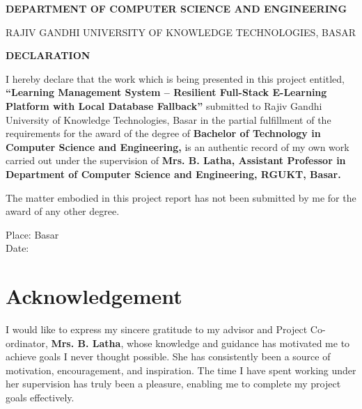 \documentclass[12pt,a4paper]{report}
\begin{document}
\begin{center}
{\fontsize{14}{16.8}\bfseries DEPARTMENT OF COMPUTER SCIENCE AND ENGINEERING\par
RAJIV GANDHI UNIVERSITY OF KNOWLEDGE TECHNOLOGIES, BASAR\par}
\vspace{1.25cm}

{\fontsize{16}{24}\bfseries DECLARATION\par}
\end{center}

\vspace{1cm}

I hereby declare that the work which is being presented in this project entitled, \textbf{``Learning Management System -- Resilient Full-Stack E-Learning Platform with Local Database Fallback''} submitted to Rajiv Gandhi University of Knowledge Technologies, Basar in the partial fulfillment of the requirements for the award of the degree of \textbf{Bachelor of Technology in Computer Science and Engineering,} is an authentic record of my own work carried out under the supervision of \textbf{Mrs. B. Latha, Assistant Professor in Department of Computer Science and Engineering, RGUKT, Basar.}

The matter embodied in this project report has not been submitted by me for the award of any other degree.

\vspace{2cm}
Place: Basar\\
Date:

\clearpage

\chapter*{Acknowledgement}

I would like to express my sincere gratitude to my advisor and Project Co-ordinator, \textbf{Mrs. B. Latha}, whose knowledge and guidance has motivated me to achieve goals I never thought possible. She has consistently been a source of motivation, encouragement, and inspiration. The time I have spent working under her supervision has truly been a pleasure, enabling me to complete my project goals effectively.
\end{document}
